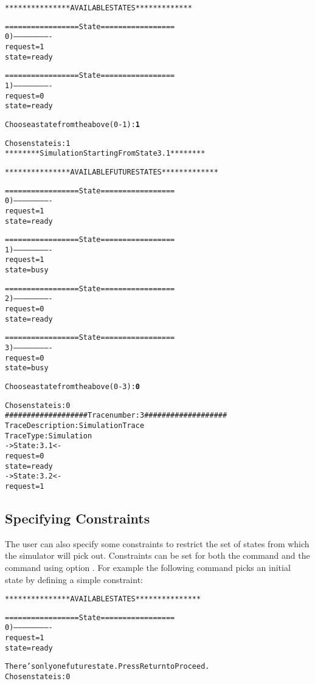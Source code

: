 \begin{alltt}
\nusmvprompt {}

***************  AVAILABLE STATES  *************

================= State =================
0) -------------------------
    request = 1
    state = ready

================= State =================
1) -------------------------
    request = 0
    state = ready


Choose a state from the above (0-1): {\bf 1} \ret

Chosen state is: 1
\nusmvprompt {}
********  Simulation Starting From State  3.1  ********

***************  AVAILABLE FUTURE STATES  *************

================= State =================
0) -------------------------
    request = 1
    state = ready

================= State =================
1) -------------------------
    request = 1
    state = busy

================= State =================
2) -------------------------
    request = 0
    state = ready

================= State =================
3) -------------------------
    request = 0
    state = busy


Choose a state from the above (0-3): {\bf 0} \ret

Chosen state is: 0
\nusmvprompt {}
################### Trace number: 3 ###################
Trace Description: Simulation Trace
Trace Type: Simulation
-> State: 3.1 <-
    request = 0
    state = ready
-> State: 3.2 <-
    request = 1
\end{alltt}

\subsection{Specifying Constraints}
\label{Specifying Constraints}
The user can also specify some constraints to restrict the
set of states from which the simulator will pick out. Constraints can
be set for both the  command and the 
command using option .  
For example the following command picks an initial state by defining
a simple constraint:
\begin{alltt}
\nusmvprompt {}

***************  AVAILABLE STATES  ***************

================= State =================
0) -------------------------
    request = 1
    state = ready


There's only one future state. Press Return to Proceed. \ret
Chosen state is: 0
\nusmvprompt {}
\shellprompt 
\end{alltt}

